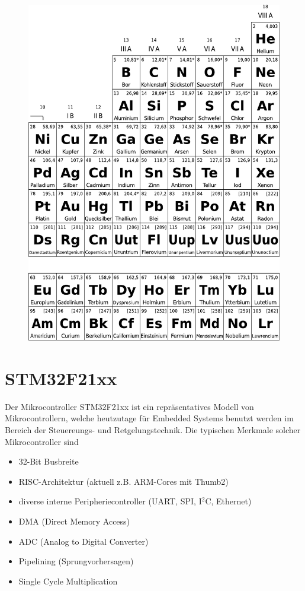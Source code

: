 \begin{appendices}
	\begin{figure}
	\centering
	\includegraphics[width=\textwidth]{../fig/periodensystem_2.pdf}
	\end{figure}

	\chapter{STM32F21xx}\label{sec:stm32f21xx}
	Der Mikrocontroller STM32F21xx ist ein repräsentatives Modell von
	Mikrocontrollern, welche heutzutage für Embedded Systems benutzt 
	werden im Bereich der Steuereungs- und Retgelungstechnik. Die 
	typischen Merkmale solcher Mikrocontroller sind
	\begin{itemize}
		\item 32-Bit Busbreite
		\item RISC-Architektur (aktuell z.B. ARM-Cores mit Thumb2)
		\item diverse interne Peripheriecontroller (UART, SPI, I$^2$C, Ethernet)
		\item DMA (Direct Memory Access)
		\item ADC (Analog to Digital Converter)
		\item Pipelining (Sprungvorhersagen)
		\item Single Cycle Multiplication
	\end{itemize}


\end{appendices}
